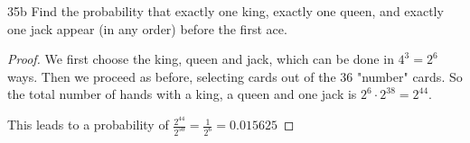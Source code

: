 \begin{exercise}{35b}
Find the probability that exactly one king, exactly one queen, and exactly one jack
appear (in any order) before the first ace.
\end{exercise}

\begin{proof}
    We first choose the king, queen and jack, which can be done in $4^3 = 2^6$ ways. Then we proceed as before, selecting cards out of the 36 "number" cards. So the total number of hands with a king, a queen and one jack is $2^6 \cdot 2^{38} = 2^{44}$.

    This leads to a probability of $\frac{2^{44}}{2^{50}} = \frac{1}{2^6} = 0.015625$
\end{proof}

